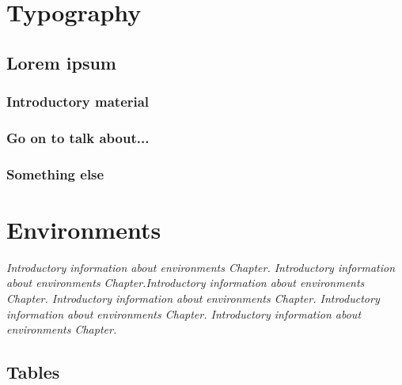 \chapter{Typography}

\begin{main-points}
    \item \lipsum[1]
    \item \lipsum[2]
    \item \lipsum[3]
\end{main-points}

\section{Lorem ipsum}

\lipsum[1]

\subsection{Introductory material}

\lipsum[2-3]

\subsection{Go on to talk about...}

\lipsum[4]

\subsection{Something else}

\lipsum[5-6]


\chapter{Environments}

{ \itshape
    Introductory information about environments Chapter. Introductory information about environments Chapter.Introductory information about environments Chapter. Introductory information about environments Chapter. Introductory information about environments Chapter. Introductory information about environments Chapter.
}

\section{Tables}



